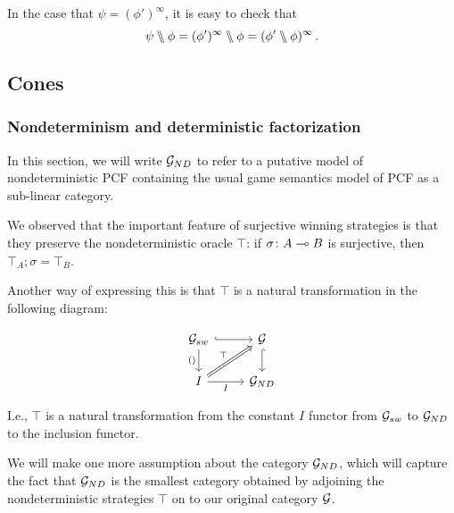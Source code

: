 \documentclass{article}
\begin{document}
\begin{remark}
  In the case that $\psi=(\phi')^\infty$, it is easy to check that 
  \[
    \psi\bbslash\phi = (\phi')^\infty \bbslash \phi = (\phi'\bbslash\phi)^\infty\,.
    \]
\end{remark}

\subsection{Cones}

\subsubsection{Nondeterminism and deterministic factorization}

In this section, we will write $\mathcal G_{ND}$ to refer to a putative model of nondeterministic PCF containing the usual game semantics model of PCF as a sub-linear category.  

We observed that the important feature of surjective winning strategies is that they preserve the nondeterministic oracle $\top$: if $\sigma\colon A\multimap B$ is surjective, then $\top_A;\sigma = \top_B$.  

Another way of expressing this is that $\top$ is a natural transformation in the following diagram:

\[
  \begin{tikzcd}
    \G_{sw} \arrow[r, hook] \arrow[d, "()"']
      & \G \arrow[d, hook] \\
    I \arrow[r, "I"'] \arrow[ur, "\top", Rightarrow]
      & \G_{ND}
  \end{tikzcd}
  \]

I.e., $\top$ is a natural transformation from the constant $I$ functor from $\mathcal G_{sw}$ to $\mathcal G_{ND}$ to the inclusion functor.

We will make one more assumption about the category $\mathcal G_{ND}$, which will capture the fact that $\mathcal G_{ND}$ is the smallest category obtained by adjoining the nondeterministic strategies $\top$ on to our original category $\mathcal G$.  
\end{document}
